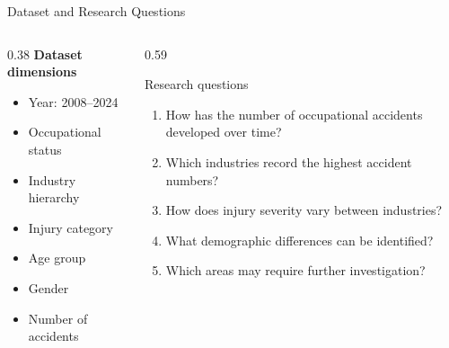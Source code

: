 \documentclass[aspectratio=169]{beamer}
\begin{document}
\begin{frame}{Dataset and Research Questions} 
\small 
\begin{columns}[T,onlytextwidth] 
\begin{column}{0.38\textwidth} 
\textbf{Dataset dimensions} 
\vspace{0.15cm} 
\begin{itemize} 
\setlength{\itemsep}{0.15cm} 
\item Year: 2008--2024 
\item Occupational status 
\item Industry hierarchy 
\item Injury category 
\item Age group 
\item Gender 
\item Number of accidents 
\end{itemize} 
\end{column} 
\begin{column}{0.59\textwidth} 
\begin{block}{Research questions} 
\begin{enumerate} 
\setlength{\itemsep}{0.2cm} 
\item How has the number of occupational accidents developed over time? 
\item Which industries record the highest accident numbers? 
\item How does injury severity vary between industries? 
\item What demographic differences can be identified? 
\item Which areas may require further investigation? 
\end{enumerate} 
\end{block} 
\end{column} 
\end{columns} 
\end{frame}
\end{document}
